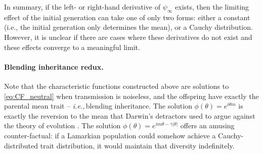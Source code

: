 \documentclass{article}
\newcommand{\E}{\mathbb{E}}
\newcommand{\ie}{\textit{i.e.,}\,}
\newcommand{\1}{\mathbbm{1}}
\DeclareMathOperator*{\re}{Re}
\theoremstyle{remark}
\theoremstyle{definition}
\begin{document}
In summary, if the left- or right-hand derivative of $\psi_\infty$ exists,
then the limiting effect of the initial generation can take one of only two forms:
either a constant (i.e., the initial generation only determines the mean),
or a Cauchy distribution.
However, it is unclear if there are cases where these derivatives do not exist
and these effects converge to a meaningful limit.


\paragraph{Blending inheritance redux.} 
Note that the characteristic functions constructed above are solutions to \eqref{eq:CF_neutral} when transmission is noiseless, and the offspring have exactly the parental mean trait -- \ie blending inheritance.  The solution $\phi(\theta) = e^{i\theta m}$ is exactly the reversion to the mean that Darwin's detractors used to argue against the theory of evolution \citep{jenkin1867,Provine1971}.  The solution $\phi(\theta) = e^{im \theta -\gamma|\theta|}$ offers an amusing counter-factual: if a Lamarkian population could somehow achieve a Cauchy-distributed trait distribution, it would maintain that diversity indefinitely.  
\end{document}

